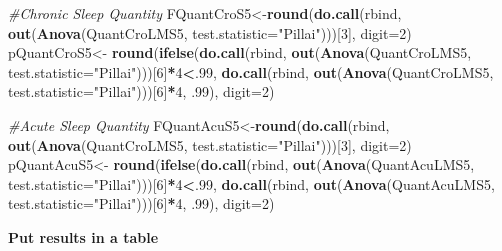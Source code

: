 \documentclass[
]{book}
\newenvironment{Shaded}{\begin{snugshade}}{\end{snugshade}}
\newcommand{\CommentTok}[1]{\textcolor[rgb]{0.56,0.35,0.01}{\textit{#1}}}
\newcommand{\DataTypeTok}[1]{\textcolor[rgb]{0.13,0.29,0.53}{#1}}
\newcommand{\DecValTok}[1]{\textcolor[rgb]{0.00,0.00,0.81}{#1}}
\newcommand{\FloatTok}[1]{\textcolor[rgb]{0.00,0.00,0.81}{#1}}
\newcommand{\KeywordTok}[1]{\textcolor[rgb]{0.13,0.29,0.53}{\textbf{#1}}}
\newcommand{\NormalTok}[1]{#1}
\newcommand{\OperatorTok}[1]{\textcolor[rgb]{0.81,0.36,0.00}{\textbf{#1}}}
\newcommand{\StringTok}[1]{\textcolor[rgb]{0.31,0.60,0.02}{#1}}
\begin{document}
\begin{Shaded}
\begin{Highlighting}[]
\CommentTok{#Chronic Sleep Quantity}
\NormalTok{FQuantCroS5<-}\KeywordTok{round}\NormalTok{(}\KeywordTok{do.call}\NormalTok{(rbind, }\KeywordTok{out}\NormalTok{(}\KeywordTok{Anova}\NormalTok{(QuantCroLMS5, }\DataTypeTok{test.statistic=}\StringTok{"Pillai"}\NormalTok{)))[}\DecValTok{3}\NormalTok{], }\DataTypeTok{digit=}\DecValTok{2}\NormalTok{)}
\NormalTok{pQuantCroS5<-}\StringTok{  }\KeywordTok{round}\NormalTok{(}\KeywordTok{ifelse}\NormalTok{(}\KeywordTok{do.call}\NormalTok{(rbind, }\KeywordTok{out}\NormalTok{(}\KeywordTok{Anova}\NormalTok{(QuantCroLMS5, }\DataTypeTok{test.statistic=}\StringTok{"Pillai"}\NormalTok{)))[}\DecValTok{6}\NormalTok{]}\OperatorTok{*}\DecValTok{4}\OperatorTok{<}\NormalTok{.}\DecValTok{99}\NormalTok{, }\KeywordTok{do.call}\NormalTok{(rbind, }\KeywordTok{out}\NormalTok{(}\KeywordTok{Anova}\NormalTok{(QuantCroLMS5, }\DataTypeTok{test.statistic=}\StringTok{"Pillai"}\NormalTok{)))[}\DecValTok{6}\NormalTok{]}\OperatorTok{*}\DecValTok{4}\NormalTok{, }\FloatTok{.99}\NormalTok{), }\DataTypeTok{digit=}\DecValTok{2}\NormalTok{)}

\CommentTok{#Acute Sleep Quantity}
\NormalTok{FQuantAcuS5<-}\KeywordTok{round}\NormalTok{(}\KeywordTok{do.call}\NormalTok{(rbind, }\KeywordTok{out}\NormalTok{(}\KeywordTok{Anova}\NormalTok{(QuantCroLMS5, }\DataTypeTok{test.statistic=}\StringTok{"Pillai"}\NormalTok{)))[}\DecValTok{3}\NormalTok{], }\DataTypeTok{digit=}\DecValTok{2}\NormalTok{)}
\NormalTok{pQuantAcuS5<-}\StringTok{  }\KeywordTok{round}\NormalTok{(}\KeywordTok{ifelse}\NormalTok{(}\KeywordTok{do.call}\NormalTok{(rbind, }\KeywordTok{out}\NormalTok{(}\KeywordTok{Anova}\NormalTok{(QuantAcuLMS5, }\DataTypeTok{test.statistic=}\StringTok{"Pillai"}\NormalTok{)))[}\DecValTok{6}\NormalTok{]}\OperatorTok{*}\DecValTok{4}\OperatorTok{<}\NormalTok{.}\DecValTok{99}\NormalTok{, }\KeywordTok{do.call}\NormalTok{(rbind, }\KeywordTok{out}\NormalTok{(}\KeywordTok{Anova}\NormalTok{(QuantAcuLMS5, }\DataTypeTok{test.statistic=}\StringTok{"Pillai"}\NormalTok{)))[}\DecValTok{6}\NormalTok{]}\OperatorTok{*}\DecValTok{4}\NormalTok{, }\FloatTok{.99}\NormalTok{), }\DataTypeTok{digit=}\DecValTok{2}\NormalTok{)}
\end{Highlighting}
\end{Shaded}

\textbf{Put results in a table}
\end{document}
